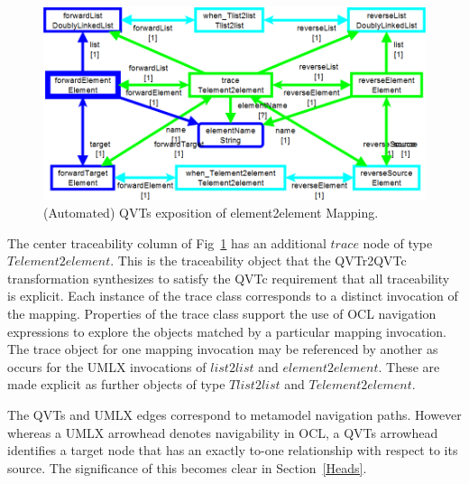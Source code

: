 \documentclass{llncs}
\begin{document}
\begin{figure}[h]
	\centering
	\includegraphics[width=1.0\textwidth]{QVTselement2element.png}
	\caption{(Automated) QVTs exposition of element2element Mapping.}
	\label{fig:QVTselement2element}
\end{figure}

The center traceability column of Fig~\ref{fig:QVTselement2element} has an additional $trace$ node of type $Telement2element$. This is the traceability object that the QVTr2QVTc transformation synthesizes to satisfy the QVTc requirement that all traceability is explicit. Each instance of the trace class corresponds to a distinct invocation of the mapping. Properties of the trace class support the use of OCL navigation expressions to explore the objects matched by a particular mapping invocation. The trace object for one mapping invocation may be referenced by another as occurs for the UMLX invocations of $list2list$ and $element2element$. These are made explicit as further objects of type $Tlist2list$ and $Telement2element$.

The QVTs and UMLX edges correspond to metamodel navigation paths. However whereas a UMLX arrowhead denotes navigability in OCL, a QVTs arrowhead identifies a target node that has an exactly to-one relationship with respect to its source. The significance of this becomes clear in Section~\ref{Heads}.

\end{document}
